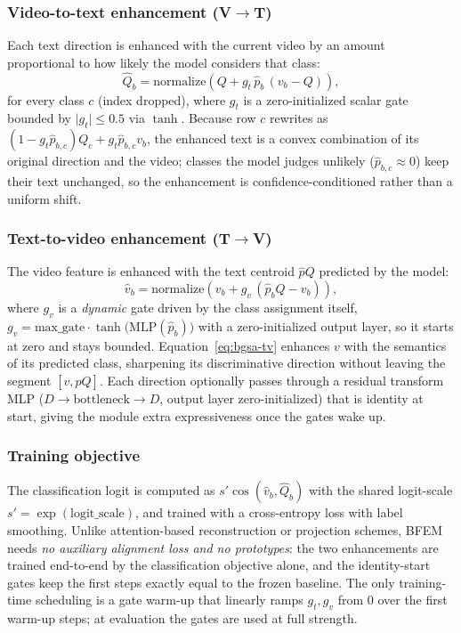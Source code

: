 \subsubsection{Video-to-text enhancement (V$\rightarrow$T)}
Each text direction is enhanced with the current video by an amount proportional to how likely the model considers that class:
\begin{equation}
  \hat{Q}_b = \mathrm{normalize}\!\left( Q + g_t \, \hat{p}_b \, (v_b - Q) \right),
  \label{eq:bgsa-vt}
\end{equation}
for every class $c$ (index dropped), where $g_t$ is a zero-initialized scalar gate bounded by $\lvert g_t \rvert \le 0.5$ via $\tanh$.
Because row $c$ rewrites as $(1 - g_t \hat{p}_{b,c}) Q_c + g_t \hat{p}_{b,c} v_b$, the enhanced text is a convex combination of its original direction and the video; classes the model judges unlikely ($\hat{p}_{b,c} \approx 0$) keep their text unchanged, so the enhancement is confidence-conditioned rather than a uniform shift.

\subsubsection{Text-to-video enhancement (T$\rightarrow$V)}
The video feature is enhanced with the text centroid $\hat{p} Q$ predicted by the model:
\begin{equation}
  \hat{v}_b = \mathrm{normalize}\!\left( v_b + g_v \, ( \hat{p}_b Q - v_b ) \right),
  \label{eq:bgsa-tv}
\end{equation}
where $g_v$ is a \emph{dynamic} gate driven by the class assignment itself, $g_v = \mathrm{max\_gate} \cdot \tanh\!\big( \mathrm{MLP}(\hat{p}_b) \big)$ with a zero-initialized output layer, so it starts at zero and stays bounded.
Equation~\eqref{eq:bgsa-tv} enhances $v$ with the semantics of its predicted class, sharpening its discriminative direction without leaving the segment $[v, \hat{p} Q]$.
Each direction optionally passes through a residual transform MLP ($D \rightarrow \text{bottleneck} \rightarrow D$, output layer zero-initialized) that is identity at start, giving the module extra expressiveness once the gates wake up.

\subsubsection{Training objective}
The classification logit is computed as $s' \cos(\hat{v}_b, \hat{Q}_b)$ with the shared logit-scale $s' = \exp(\mathrm{logit\_scale})$, and trained with a cross-entropy loss with label smoothing.
Unlike attention-based reconstruction or projection schemes, BFEM needs \emph{no auxiliary alignment loss and no prototypes}: the two enhancements are trained end-to-end by the classification objective alone, and the identity-start gates keep the first steps exactly equal to the frozen baseline.
The only training-time scheduling is a gate warm-up that linearly ramps $g_t, g_v$ from $0$ over the first warm-up steps; at evaluation the gates are used at full strength.

